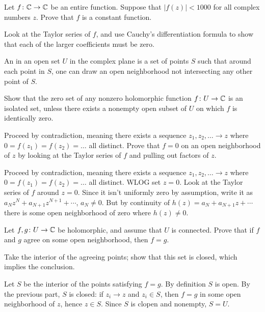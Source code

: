 \begin{sproblem}
	\onechili
	Let $f \colon \mathbb C \to \mathbb C$ be an entire function.
	Suppose that $\left\lvert f(z) \right\rvert < 1000$ for all complex numbers $z$.
	Prove that $f$ is a constant function.
	\begin{hint}
		Look at the Taylor series of $f$,
		and use Cauchy's differentiation formula to
		show that each of the larger coefficients must be zero.
	\end{hint}
\end{sproblem}

\begin{sproblem}
	An  in an open set $U$ in the complex plane is a
	set of points $S$ such that around each point in $S$,
	one can draw an open neighborhood not intersecting any other point of $S$.

	Show that the zero set of any nonzero holomorphic
	function $f \colon U \to \mathbb C$ is an isolated set,
	unless there exists a nonempty open subset of $U$
	on which $f$ is identically zero.
	\begin{hint}
		Proceed by contradiction,
		meaning there exists a sequence $z_1, z_2, \dotsc \to z$
		where $0 = f(z_1) = f(z_2) = \dots$ all distinct.
		Prove that $f = 0$ on an open neighborhood of $z$
		by looking at the Taylor series of $f$ and
		pulling out factors of $z$.
	\end{hint}
	\begin{sol}
		Proceed by contradiction, meaning there exists a sequence $z_1, z_2, \dotsc \to z$
		where $0 = f(z_1) = f(z_2) = \dots$ all distinct.
		WLOG set $z=0$.
		Look at the Taylor series of $f$ around $z=0$.
		Since it isn't uniformly zero by assumption,
		write it as $a_N z^N + a_{N+1}z^{N+1} + \cdots$, $a_N \neq 0$.
		But by continuity of $h(z) = a_N + a_{N+1}z + \cdots$ there is some
		open neighborhood of zero where $h(z) \neq 0$.
	\end{sol}
\end{sproblem}

\begin{sproblem}
	\label{prob:identity_thm}
	\onechili
	Let $f, g \colon U \to \mathbb C$ be holomorphic, and assume that $U$ is connected.
	Prove that if $f$ and $g$ agree on some open neighborhood,
	then $f = g$.
	\begin{hint}
		Take the interior of the agreeing points;
		show that this set is closed, which implies the conclusion.
	\end{hint}
	\begin{sol}
		Let $S$ be the interior of the points satisfying $f=g$.
		By definition $S$ is open.
		By the previous part, $S$ is closed: if $z_i \to z$ and $z_i \in S$,
		then $f=g$ in some open neighborhood of $z$, hence $z \in S$.
		Since $S$ is clopen and nonempty, $S = U$.
	\end{sol}
\end{sproblem}

